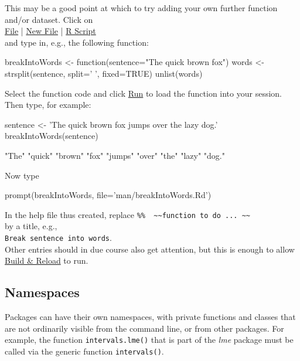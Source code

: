 \documentclass{tufte-book}\usepackage[]{graphicx}\usepackage[]{color}
\newcommand{\txtt}[1]{\texttt{#1}}
\begin{document}
This may be a good point at which to try adding your own further
function and/or dataset.  Click on\\
\qquad \underline{File} | \underline{New File} | \underline{R
  Script}\\
\noindent and type in, e.g., the following function:
\begin{fullwidth}

\begin{Schunk}
\begin{Sinput}
breakIntoWords <- function(sentence="The quick brown fox"){
  words <- strsplit(sentence, split=' ', fixed=TRUE)
  unlist(words)
}
\end{Sinput}
\end{Schunk}

\end{fullwidth}

Select the function code and click \underline{Run} to load
the function into your session.  Then type, for example:
\begin{fullwidth}

\begin{Schunk}
\begin{Sinput}
sentence <- 'The quick brown fox jumps over the lazy dog.'
breakIntoWords(sentence)
\end{Sinput}
\begin{Soutput}
[1] "The"   "quick" "brown" "fox"   "jumps" "over"  "the"   "lazy"  "dog." 
\end{Soutput}
\end{Schunk}
\end{fullwidth}

Now type
\begin{Schunk}
\begin{Sinput}
prompt(breakIntoWords, file='man/breakIntoWords.Rd')
\end{Sinput}
\end{Schunk}
In the help file thus created, replace
\verb!%%  ~~function to do ... ~~! \\
\noindent by a title, e.g.,\\
\verb!Break sentence into words!.\\
\noindent Other entries should
in due course also get attention, but this is enough to
allow \underline{Build \& Reload} to run.

\subsection*{Namespaces}
Packages can have their own namespaces, with private functions and
classes that are not ordinarily visible from the command line, or from
other packages.  For example, the function \txtt{intervals.lme()}
that is part of the \textit{lme} package must be called via the generic
function \txtt{intervals()}.
\end{document}
